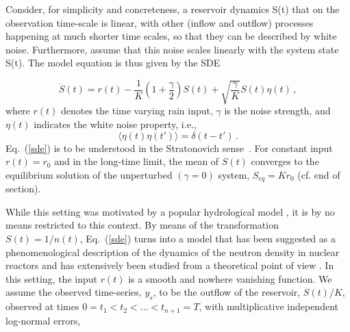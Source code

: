 \documentclass[11pt]{article}
\theoremstyle{definition}
\begin{document}
Consider, for simplicity and concreteness, a reservoir dynamics S(t) that on the observation time-scale is linear, with other (inflow and outflow) processes happening at much shorter time scales, so that they can be described by white noise. Furthermore, assume that this noise scales linearly with the system state S(t). The model equation is thus given by the SDE

\begin{equation}\label{sde}
\dot{S}(t) = r(t) - \frac{1}{K}\left(1+\frac{\gamma}{2}\right) S(t)
+
\sqrt{\frac{\gamma}{K}} S(t){\eta}(t)\,,
\end{equation}
where $r(t)$ denotes the time varying rain input, $\gamma$ is the noise strength, and $\eta(t)$ indicates the white noise property, i.e.,
\begin{equation}\label{whitenoise}
\langle\eta(t)\eta(t')\rangle = \delta(t-t')\,.
\end{equation}
Eq.~(\ref{sde}) is to be understood in the Stratonovich sense~\cite{stratonovich_1968}.
For constant input $r(t) = r_0$ and in the long-time limit, the mean of $S(t)$ converges to the equilibrium solution of the unperturbed $(\gamma = 0)$ system, $S_{eq} = Kr_{0}$ (cf. end of section). 



While this setting was motivated by a popular hydrological model \cite{breinholt_2011_SDE}, it is by no means restricted to this context. By means of the transformation $S(t) = 1/n(t)$, Eq.~(\ref{sde}) turns into a model that has been suggested as a phenomenological description of the dynamics of the neutron density in nuclear reactors \cite{dutre_1977_SDE} and has extensively been studied from a theoretical point of view \cite{schenzle_1979_multStochProc, fujisaka_1986_intermittency}.
In this setting, the input $r(t)$ is a smooth and nowhere vanishing function. We assume the observed time-series, $y_s$, to be the outflow of the reservoir, $S(t)/K$, observed at times $0=t_1<t_2<\dots < t_{n+1}=T$, with multiplicative independent log-normal errors, 
\end{document}
